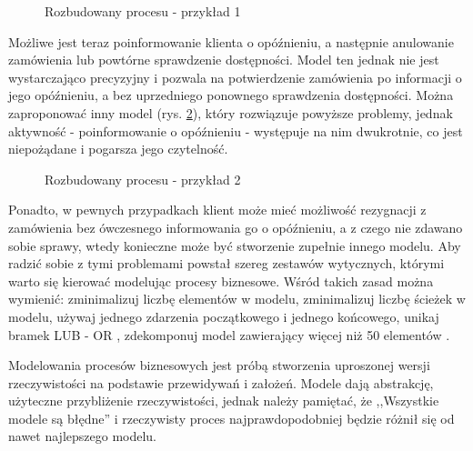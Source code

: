 \begin{figure}[h]
	\caption{\label{fig:complicated_business_process_1}Rozbudowany procesu - przykład 1}
\end{figure}

Możliwe jest teraz poinformowanie klienta o opóźnieniu, a następnie anulowanie zamówienia lub powtórne sprawdzenie dostępności. Model ten jednak nie jest wystarczająco precyzyjny i pozwala na potwierdzenie zamówienia po informacji o jego opóźnieniu, a bez uprzedniego ponownego sprawdzenia dostępności. Można zaproponować inny model (rys. \ref{fig:complicated_business_process_2}), który rozwiązuje powyższe problemy, jednak aktywność - poinformowanie o opóźnieniu - występuje na nim dwukrotnie, co jest niepożądane i  pogarsza jego czytelność.

\begin{figure}[h]
	\caption{\label{fig:complicated_business_process_2}Rozbudowany procesu - przykład 2}
\end{figure}

Ponadto, w pewnych przypadkach klient może mieć możliwość rezygnacji z zamówienia bez ówczesnego informowania go o opóźnieniu, a z czego nie zdawano sobie sprawy, wtedy konieczne może być stworzenie zupełnie innego modelu. Aby radzić sobie z tymi problemami powstał szereg zestawów wytycznych, którymi warto się kierować modelując procesy biznesowe. Wśród takich zasad można wymienić: zminimalizuj liczbę elementów w modelu, zminimalizuj liczbę ścieżek w modelu, używaj jednego zdarzenia początkowego i jednego końcowego, unikaj bramek LUB - OR , zdekomponuj model zawierający więcej niż 50 elementów \cite{7PMG}.

Modelowania procesów biznesowych jest próbą stworzenia uproszonej wersji rzeczywistości na podstawie przewidywań i założeń. Modele dają abstrakcję, użyteczne przybliżenie rzeczywistości, jednak należy pamiętać, że ,,Wszystkie modele są błędne'' i rzeczywisty proces najprawdopodobniej będzie różnił się od nawet najlepszego modelu. 


